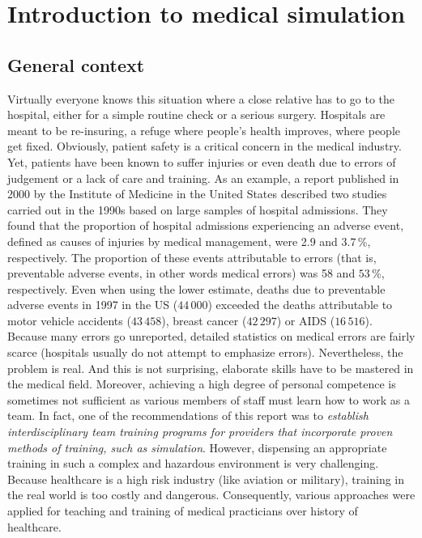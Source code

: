 \chapter{Introduction to medical simulation}
\label{chap1}


\section{General context}

Virtually everyone knows this situation where a close relative has to go to the hospital, either for a simple routine check or a serious surgery. Hospitals are meant to be re-insuring, a refuge where people's health improves, where people get fixed. Obviously, patient safety is a critical concern in the medical industry. Yet, patients have been known to suffer injuries or even death due to errors of judgement or a lack of care and training. As an example, a report published in 2000 by the Institute of Medicine in the United States \citep{Kohn00} described two studies carried out in the 1990s based on large samples of hospital admissions. They found that the proportion of hospital admissions experiencing an adverse event, defined as causes of injuries by medical management, were 2.9 and $3.7\,$\%, respectively. The proportion of these events attributable to errors (that is, preventable adverse events, in other words medical errors) was 58 and $53\,$\%, respectively. Even when using the lower estimate, deaths due to preventable adverse events in 1997 in the US ($44\,000$) exceeded the deaths attributable to motor vehicle accidents ($43\,458$), breast cancer ($42\,297$) or AIDS ($16\,516$). Because many errors go unreported, detailed statistics on medical errors are fairly scarce (hospitals usually do not attempt to emphasize errors). Nevertheless, the problem is real. And this is not surprising, elaborate skills have to be mastered in the medical field. Moreover, achieving a high degree of personal competence is sometimes not sufficient as various members of staff must learn how to work as a team. In fact, one of the recommendations of this report \citep{Kohn00} was to \emph{establish interdisciplinary team training programs for providers that incorporate proven methods of training, such as simulation}. However, dispensing an appropriate training in such a complex and hazardous environment is very challenging. Because healthcare is a high risk industry (like aviation or military), training in the real world is too costly and dangerous. Consequently, various approaches were applied for teaching and training of medical practicians over history of healthcare. 

